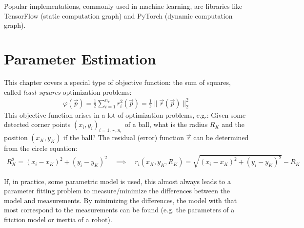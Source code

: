 		Popular implementations, commonly used in machine learning, are libraries like TensorFlow (static computation graph) and PyTorch (dynamic computation graph).

\chapter{Parameter Estimation}
	\label{c:leastSquares}
	
	This chapter covers a special type of objective function: the sum of squares, called \emph{least squares} optimization problems:
	\begin{align*}
		\varphi(\vec{p}) = \frac{1}{2} \sum_{i = 1}^{n_r} r_i^2(\vec{p}) = \frac{1}{2} \lVert \vec{r}(\vec{p}) \rVert_2^2
	\end{align*}
	This objective function arises in a lot of optimization problems, e.g.: Given some detected corner points \( (x_i, y_i)_{i = 1, \cdots, n_r} \) of a ball, what is the radius \(R_K\) and the position \( (x_K, y_K) \) if the ball? The residual (error) function \(\vec{r}\) can be determined from the circle equation:
	\begin{align*}
		R_K^2 = (x_i - x_K)^2 + (y_i - y_K)^2 \quad\implies\quad r_i(x_K, y_K, R_K) = \sqrt{(x_i - x_K)^2 + (y_i - y_K)^2} - R_K
	\end{align*}
	
	If, in practice, some parametric model is used, this almost always leads to a parameter fitting problem to measure/minimize the differences between the model and measurements. By minimizing the differences, the model with that most correspond to the measurements can be found (e.g. the parameters of a friction model or inertia of a robot).

